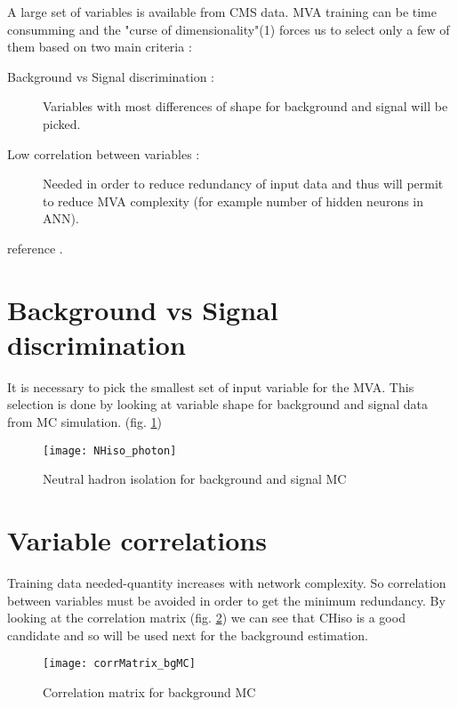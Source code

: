 \label{sec:unchapitre}

A large set of variables is available from CMS data. MVA training can be time consumming and the "curse of
dimensionality"(1) forces us to select only a few of them based on two main criteria :
\begin{description}
    \item [Background vs Signal discrimination :] Variables with most differences of shape for background and signal will be picked.
    \item [Low correlation between variables :] Needed in order to reduce redundancy of input data and thus will permit
    to reduce MVA complexity (for example number of hidden neurons in ANN).
\end{description}

reference \cite{CMS2015}.

\section{Background vs Signal discrimination}

It is necessary to pick the smallest set of input variable for the MVA. This selection is done by looking at variable
shape for background and signal data from MC simulation. (fig. \ref{NHiso_photon_dataVsMCbg})

\begin{figure}[h!]
  \centering
  \texttt{[image: NHiso\_photon]}\\[1cm]
  \caption{Neutral hadron isolation for background and signal MC}
  \label{NHiso_photon_dataVsMCbg}
\end{figure}


\section{Variable correlations}

Training data needed-quantity increases with network complexity. So correlation between variables must be avoided in
order to get the minimum redundancy. By looking at the correlation matrix (fig. \ref{corrMatrix_bgMC}) we can see that CHiso is
a good candidate and so will be used next for the background estimation.

\begin{figure}[h!]
  \centering
  \texttt{[image: corrMatrix\_bgMC]}\\[1cm]
  \caption{Correlation matrix for background MC}
  \label{corrMatrix_bgMC}
\end{figure}

